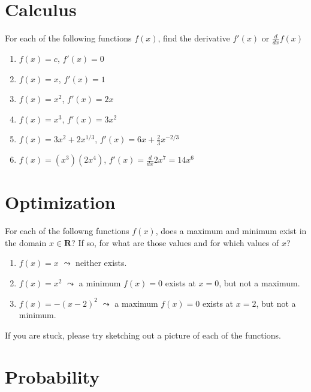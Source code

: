 \documentclass[
  letterpaper,
]{book}
\providecommand{\tightlist}{%
  \setlength{\itemsep}{0pt}\setlength{\parskip}{0pt}}\usepackage{longtable,booktabs,array}
\theoremstyle{definition}
\theoremstyle{definition}
\theoremstyle{plain}
\theoremstyle{definition}
\theoremstyle{plain}
\theoremstyle{plain}
\theoremstyle{remark}
\begin{document}
\hypertarget{calculus-1}{%
\section*{Calculus}\label{calculus-1}}

For each of the following functions \(f(x)\), find the derivative
\(f'(x)\) or \(\frac{d}{dx}f(x)\)

\begin{enumerate}
\def\labelenumi{\arabic{enumi}.}
\tightlist
\item
  \(f(x)=c\), \(f'(x) = 0\)
\item
  \(f(x)=x\), \(f'(x) = 1\)
\item
  \(f(x)=x^2\), \(f'(x) = 2x\)
\item
  \(f(x)=x^3\), \(f'(x) = 3x^2\)
\item
  \(f(x)=3x^2+2x^{1/3}\), \(f'(x) = 6x + \frac{2}{3}x^{-2/3}\)
\item
  \(f(x)=(x^3)(2x^4)\), \(f'(x) = \frac{d}{dx}2x^7 = 14x^6\)
\end{enumerate}

\hypertarget{optimization-1}{%
\section*{Optimization}\label{optimization-1}}

For each of the followng functions \(f(x)\), does a maximum and minimum
exist in the domain \(x \in \mathbf{R}\)? If so, for what are those
values and for which values of \(x\)?

\begin{enumerate}
\def\labelenumi{\arabic{enumi}.}
\tightlist
\item
  \(f(x) = x\) \(\leadsto\) neither exists.
\item
  \(f(x) = x^2\) \(\leadsto\) a minimum \(f(x) = 0\) exists at
  \(x = 0\), but not a maximum.
\item
  \(f(x) = -(x - 2)^2\) \(\leadsto\) a maximum \(f(x) = 0\) exists at
  \(x = 2\), but not a minimum.
\end{enumerate}

If you are stuck, please try sketching out a picture of each of the
functions.

\hypertarget{probability-2}{%
\section*{Probability}\label{probability-2}}
\end{document}
